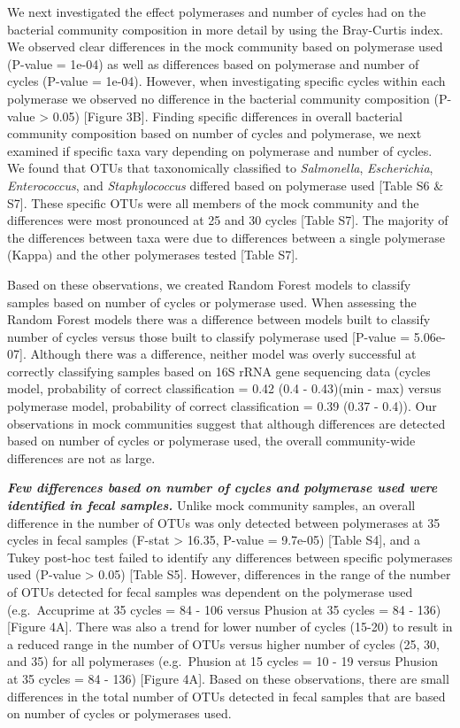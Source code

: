 \documentclass[11pt,]{article}
\begin{document}
We next investigated the effect polymerases and number of cycles had on
the bacterial community composition in more detail by using the
Bray-Curtis index. We observed clear differences in the mock community
based on polymerase used (P-value = 1e-04) as well as differences based
on polymerase and number of cycles (P-value = 1e-04). However, when
investigating specific cycles within each polymerase we observed no
difference in the bacterial community composition (P-value
\textgreater{} 0.05) {[}Figure 3B{]}. Finding specific differences in
overall bacterial community composition based on number of cycles and
polymerase, we next examined if specific taxa vary depending on
polymerase and number of cycles. We found that OTUs that taxonomically
classified to \emph{Salmonella}, \emph{Escherichia},
\emph{Enterococcus}, and \emph{Staphylococcus} differed based on
polymerase used {[}Table S6 \& S7{]}. These specific OTUs were all
members of the mock community and the differences were most pronounced
at 25 and 30 cycles {[}Table S7{]}. The majority of the differences
between taxa were due to differences between a single polymerase (Kappa)
and the other polymerases tested {[}Table S7{]}.

Based on these observations, we created Random Forest models to classify
samples based on number of cycles or polymerase used. When assessing the
Random Forest models there was a difference between models built to
classify number of cycles versus those built to classify polymerase used
{[}P-value = 5.06e-07{]}. Although there was a difference, neither model
was overly successful at correctly classifying samples based on 16S rRNA
gene sequencing data (cycles model, probability of correct
classification = 0.42 (0.4 - 0.43)(min - max) versus polymerase model,
probability of correct classification = 0.39 (0.37 - 0.4)). Our
observations in mock communities suggest that although differences are
detected based on number of cycles or polymerase used, the overall
community-wide differences are not as large.

\textbf{\emph{Few differences based on number of cycles and polymerase
used were identified in fecal samples.}} Unlike mock community samples,
an overall difference in the number of OTUs was only detected between
polymerases at 35 cycles in fecal samples (F-stat \textgreater{} 16.35,
P-value = 9.7e-05) {[}Table S4{]}, and a Tukey post-hoc test failed to
identify any differences between specific polymerases used (P-value
\textgreater{} 0.05) {[}Table S5{]}. However, differences in the range
of the number of OTUs detected for fecal samples was dependent on the
polymerase used (e.g.~Accuprime at 35 cycles = 84 - 106 versus Phusion
at 35 cycles = 84 - 136) {[}Figure 4A{]}. There was also a trend for
lower number of cycles (15-20) to result in a reduced range in the
number of OTUs versus higher number of cycles (25, 30, and 35) for all
polymerases (e.g.~Phusion at 15 cycles = 10 - 19 versus Phusion at 35
cycles = 84 - 136) {[}Figure 4A{]}. Based on these observations, there
are small differences in the total number of OTUs detected in fecal
samples that are based on number of cycles or polymerases used.
\end{document}
